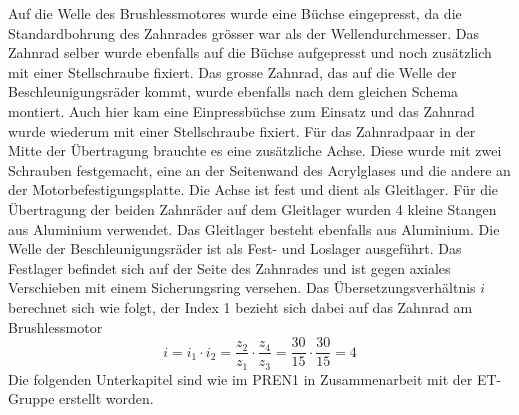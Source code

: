         Auf die Welle des Brushlessmotores wurde eine Büchse eingepresst, da die Standardbohrung des 
        Zahnrades grösser war als der Wellendurchmesser. Das Zahnrad selber wurde ebenfalls auf die 
        Büchse aufgepresst und noch zusätzlich mit einer Stellschraube fixiert. Das grosse Zahnrad, 
        das auf die Welle der Beschleunigungsräder kommt, wurde ebenfalls nach dem gleichen Schema 
        montiert. Auch hier kam eine Einpressbüchse zum Einsatz und das Zahnrad wurde wiederum mit 
        einer Stellschraube fixiert. Für das Zahnradpaar in der Mitte der Übertragung brauchte es eine 
        zusätzliche Achse. Diese wurde mit zwei Schrauben festgemacht, eine an der Seitenwand des 
        Acrylglases und die andere an der Motorbefestigungsplatte. Die Achse ist fest und dient als 
        Gleitlager. Für die Übertragung der beiden Zahnräder auf dem Gleitlager wurden 4 kleine Stangen 
        aus Aluminium verwendet. Das Gleitlager besteht ebenfalls aus Aluminium. Die Welle der 
        Beschleunigungsräder ist als Fest- und Loslager ausgeführt. Das Festlager befindet sich auf 
        der Seite des Zahnrades und ist gegen axiales Verschieben mit einem Sicherungsring versehen. 
        Das Übersetzungsverhältnis $i$ berechnet sich wie folgt, der Index 1 bezieht sich dabei auf 
        das Zahnrad am Brushlessmotor
        \begin{equation}
            i = i_1 \cdot i_2 = \frac{z_2}{z_1} \cdot \frac{z_4}{z_3} = \frac{30}{15} \cdot \frac{30}{15} = 4
        \end{equation}
%
Die folgenden Unterkapitel sind wie im PREN1 in Zusammenarbeit mit der ET-Gruppe erstellt worden.


